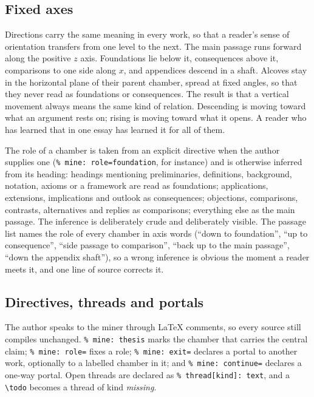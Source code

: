 \documentclass[11pt]{article}
\theoremstyle{remark}
\begin{document}
\subsection{Fixed axes}

Directions carry the same meaning in every work, so that a reader's sense of orientation transfers from one level to the next. The main passage runs forward along the positive $z$ axis. Foundations lie below it, consequences above it, comparisons to one side along $x$, and appendices descend in a shaft. Alcoves stay in the horizontal plane of their parent chamber, spread at fixed angles, so that they never read as foundations or consequences. The result is that a vertical movement always means the same kind of relation. Descending is moving toward what an argument rests on; rising is moving toward what it opens. A reader who has learned that in one essay has learned it for all of them.

The role of a chamber is taken from an explicit directive when the author supplies one (\texttt{\% mine: role=foundation}, for instance) and is otherwise inferred from its heading: headings mentioning preliminaries, definitions, background, notation, axioms or a framework are read as foundations; applications, extensions, implications and outlook as consequences; objections, comparisons, contrasts, alternatives and replies as comparisons; everything else as the main passage. The inference is deliberately crude and deliberately visible. The passage list names the role of every chamber in axis words (``down to foundation'', ``up to consequence'', ``side passage to comparison'', ``back up to the main passage'', ``down the appendix shaft''), so a wrong inference is obvious the moment a reader meets it, and one line of source corrects it.

\subsection{Directives, threads and portals}

The author speaks to the miner through LaTeX comments, so every source still compiles unchanged. \texttt{\% mine: thesis} marks the chamber that carries the central claim; \texttt{\% mine: role=} fixes a role; \texttt{\% mine: exit=} declares a portal to another work, optionally to a labelled chamber in it; and \texttt{\% mine: continue=} declares a one-way portal. Open threads are declared as \texttt{\% thread[kind]: text}, and a \texttt{\textbackslash todo} becomes a thread of kind \emph{missing}.
\end{document}
